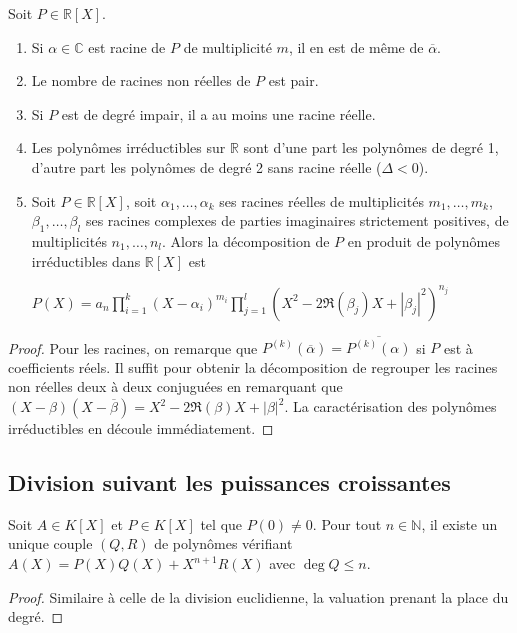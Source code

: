 \begin{thm}
Soit $P \in \mathbb{R}[X]$.
\begin{enumerate}
\item Si $\alpha \in \mathbb{C}$ est racine de $P$ de multiplicité $m$, il en est de même de $\overline{\alpha}$.
\item Le nombre de racines non réelles de $P$ est pair.
\item Si $P$ est de degré impair, il a au moins une racine réelle.
\item Les polynômes irréductibles sur $\mathbb{R}$ sont d'une part les polynômes de degré 1, d'autre part les polynômes de degré 2 sans racine réelle ($\Delta < 0$).
\item Soit $P \in \mathbb{R}[X]$, soit $\alpha_1,\ldots,\alpha_k$ ses racines réelles de multiplicités $m_1,\ldots,m_k$, $\beta_1,\ldots,\beta_l$ ses racines complexes de parties imaginaires strictement positives, de multiplicités $n_1,\ldots,n_l$. Alors la décomposition de $P$ en produit de polynômes irréductibles dans $\mathbb{R}[X]$ est

$P(X) = a_n \prod_{i=1}^k (X - \alpha_i)^{m_i} \prod_{j=1}^l (X^2 - 2\Re(\beta_j)X + |\beta_j|^2)^{n_j}$
\end{enumerate}
\end{thm}

\begin{proof}
Pour les racines, on remarque que $P^{(k)}(\overline{\alpha}) = \overline{P^{(k)}(\alpha)}$ si $P$ est à coefficients réels. Il suffit pour obtenir la décomposition de regrouper les racines non réelles deux à deux conjuguées en remarquant que $(X - \beta)(X - \overline{\beta}) = X^2 - 2\Re(\beta)X + |\beta|^2$. La caractérisation des polynômes irréductibles en découle immédiatement.
\end{proof}

\subsection{Division suivant les puissances croissantes}

\begin{thm}
Soit $A \in K[X]$ et $P \in K[X]$ tel que $P(0) \neq 0$. Pour tout $n \in \mathbb{N}$, il existe un unique couple $(Q,R)$ de polynômes vérifiant $A(X) = P(X)Q(X) + X^{n+1}R(X)$ avec $\deg Q \leq n$.
\end{thm}

\begin{proof}
Similaire à celle de la division euclidienne, la valuation prenant la place du degré.
\end{proof}